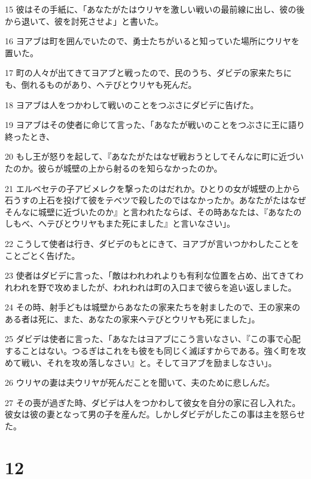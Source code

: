 \par 15 彼はその手紙に、「あなたがたはウリヤを激しい戦いの最前線に出し、彼の後から退いて、彼を討死させよ」と書いた。
\par 16 ヨアブは町を囲んでいたので、勇士たちがいると知っていた場所にウリヤを置いた。
\par 17 町の人々が出てきてヨアブと戦ったので、民のうち、ダビデの家来たちにも、倒れるものがあり、ヘテびとウリヤも死んだ。
\par 18 ヨアブは人をつかわして戦いのことをつぶさにダビデに告げた。
\par 19 ヨアブはその使者に命じて言った、「あなたが戦いのことをつぶさに王に語り終ったとき、
\par 20 もし王が怒りを起して、『あなたがたはなぜ戦おうとしてそんなに町に近づいたのか。彼らが城壁の上から射るのを知らなかったのか。
\par 21 エルベセテの子アビメレクを撃ったのはだれか。ひとりの女が城壁の上から石うすの上石を投げて彼をテベツで殺したのではなかったか。あなたがたはなぜそんなに城壁に近づいたのか』と言われたならば、その時あなたは、『あなたのしもべ、ヘテびとウリヤもまた死にました』と言いなさい」。
\par 22 こうして使者は行き、ダビデのもとにきて、ヨアブが言いつかわしたことをことごとく告げた。
\par 23 使者はダビデに言った、「敵はわれわれよりも有利な位置を占め、出てきてわれわれを野で攻めましたが、われわれは町の入口まで彼らを追い返しました。
\par 24 その時、射手どもは城壁からあなたの家来たちを射ましたので、王の家来のある者は死に、また、あなたの家来ヘテびとウリヤも死にました」。
\par 25 ダビデは使者に言った、「あなたはヨアブにこう言いなさい、『この事で心配することはない。つるぎはこれをも彼をも同じく滅ぼすからである。強く町を攻めて戦い、それを攻め落しなさい』と。そしてヨアブを励ましなさい」。
\par 26 ウリヤの妻は夫ウリヤが死んだことを聞いて、夫のために悲しんだ。
\par 27 その喪が過ぎた時、ダビデは人をつかわして彼女を自分の家に召し入れた。彼女は彼の妻となって男の子を産んだ。しかしダビデがしたこの事は主を怒らせた。

\chapter{12}

